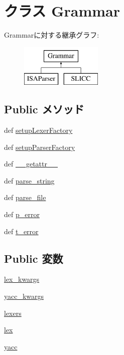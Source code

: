 \hypertarget{classm5_1_1util_1_1grammar_1_1Grammar}{
\section{クラス Grammar}
\label{classm5_1_1util_1_1grammar_1_1Grammar}
}
Grammarに対する継承グラフ:\begin{figure}[H]
\begin{center}
\leavevmode
\includegraphics[height=2cm]{classm5_1_1util_1_1grammar_1_1Grammar}
\end{center}
\end{figure}
\subsection*{Public メソッド}
\begin{DoxyCompactItemize}
\item 
def \hyperlink{classm5_1_1util_1_1grammar_1_1Grammar_afd19357236a0a2a502d0fe8f356219ba}{setupLexerFactory}
\item 
def \hyperlink{classm5_1_1util_1_1grammar_1_1Grammar_af6772e03881638eacde2754d2063ebed}{setupParserFactory}
\item 
def \hyperlink{classm5_1_1util_1_1grammar_1_1Grammar_a0a990b3ec3889d40889daca9ee5e4695}{\_\-\_\-getattr\_\-\_\-}
\item 
def \hyperlink{classm5_1_1util_1_1grammar_1_1Grammar_ab577300b152e1da25311efe2a260091d}{parse\_\-string}
\item 
def \hyperlink{classm5_1_1util_1_1grammar_1_1Grammar_a14401ccceaf67f005506de0a8320b089}{parse\_\-file}
\item 
def \hyperlink{classm5_1_1util_1_1grammar_1_1Grammar_ae0bf47d4531770b27bea904d5ed183f6}{p\_\-error}
\item 
def \hyperlink{classm5_1_1util_1_1grammar_1_1Grammar_aa36cfdc4c544b59202ebc57d37d62a31}{t\_\-error}
\end{DoxyCompactItemize}
\subsection*{Public 変数}
\begin{DoxyCompactItemize}
\item 
\hyperlink{classm5_1_1util_1_1grammar_1_1Grammar_aa7dd425f02ef2d1c008814a8335df842}{lex\_\-kwargs}
\item 
\hyperlink{classm5_1_1util_1_1grammar_1_1Grammar_a5549eb79d43c8f06fc1dc6b60bba9b89}{yacc\_\-kwargs}
\item 
\hyperlink{classm5_1_1util_1_1grammar_1_1Grammar_a142b9050c6ced35d0741a1f40adab3c6}{lexers}
\item 
\hyperlink{classm5_1_1util_1_1grammar_1_1Grammar_a81156b877ef6f8c77e202c4fcdde6c35}{lex}
\item 
\hyperlink{classm5_1_1util_1_1grammar_1_1Grammar_a92539ec58e9d3269a2e3d0c7e2d1cd44}{yacc}
\end{DoxyCompactItemize}


